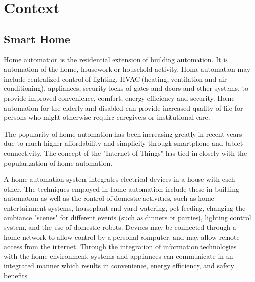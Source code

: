 
\section{Context}
\subsection{Smart Home}

Home automation \citep{homeautomation} is the residential extension of building automation. It is automation of the home, housework or household activity. Home automation may include centralized control of lighting, HVAC (heating, ventilation and air conditioning), appliances, security locks of gates and doors and other systems, to provide improved convenience, comfort, energy efficiency and security. Home automation for the elderly and disabled can provide increased quality of life for persons who might otherwise require caregivers or institutional care.

The popularity of home automation has been increasing greatly in recent years due to much higher affordability and simplicity through smartphone and tablet connectivity. The concept of the "Internet of Things" has tied in closely with the popularization of home automation.

A home automation system \citep{homeautomation1} integrates electrical devices in a house with each other. The techniques employed in home automation include those in building automation as well as the control of domestic activities, such as home entertainment systems, houseplant and yard watering, pet feeding, changing the ambiance "scenes" for different events (such as dinners or parties), lighting control system, and the use of domestic robots. Devices may be connected through a home network to allow control by a personal computer, and may allow remote access from the internet. Through the integration of information technologies with the home environment, systems and appliances can communicate in an integrated manner which results in convenience, energy efficiency, and safety benefits.

